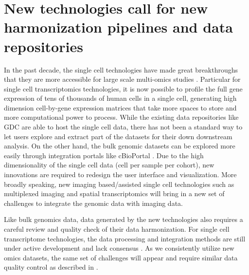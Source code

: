 \section{New technologies call for new harmonization pipelines and data repositories}
In the past decade, the single cell technologies have made great breakthroughs that they are more accessible for large scale multi-omics studies \cite{chappelll_voett:SingleCellMulti2018}. Particular for single cell transcriptomics technologies, it is now possible to profile the full gene expression of tens of thousands of human cells in a single cell, generating high dimension cell-by-gene expression matrices that take more spaces to store and more computational power to process. While the existing data repositories like GDC are able to host the single cell data, there has not been a standard way to let users explore and extract part of the datasets for their down downstream analysis. On the other hand, the bulk genomic datasets can be explored more easily through integration portals like cBioPortal \cite{ceramie_schultzn:CBioCancer2012,gaoj_schultzn:IntegrativeAnalysis2013}. Due to the high dimensionality of the single cell data (cell per sample per cohort), new innovations are required to redesign the user interface and visualization. More broadly speaking, new imaging based/assisted single cell technologies such as multiplexed imaging \cite{giesenc_bodenmillerb:HighlyMultiplexed2014,goltsevy_nolangp:DeepProfiling2018,tanwcc_limtkh:OverviewMultiplex2020} and spatial transcriptomics \cite{morrissa_morrissa:PinpointingSpatial2019,longosk_khavaripa:IntegratingSinglecell2021,driesr_yuangc:AdvancesSpatial2021} will bring in a new set of challenges to integrate the genomic data with imaging data.

Like bulk genomics data, data generated by the new technologies also requires a careful review and quality check of their data harmonization. For single cell transcriptome technologies, the data processing and integration methods are still under active development and lack consensus \cite{lahnemannd_schonhutha:ElevenGrand2020,andrewsts_hembergm:TutorialGuidelines2021}. As we consistently utilize new omics datasets, the same set of challenges will appear and require similar data quality control as described in .


